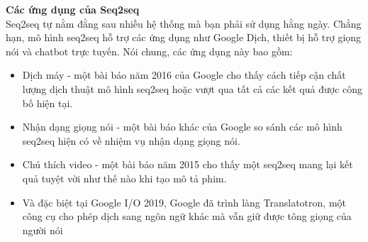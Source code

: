 
\large{\textbf{Các ứng dụng của Seq2seq}} \\[0.2em]
Seq2seq tự nằm đằng sau nhiều hệ thống mà bạn phải sử dụng hằng ngày. Chẳng hạn, mô hình seq2seq hỗ trợ các ứng dụng
như Google Dịch, thiết bị hỗ trợ giọng nói và chatbot trực tuyến. Nói chung, các ứng dụng này bao gồm:

\begin{itemize}
    \item Dịch máy - một bài báo năm 2016 của Google cho thấy cách tiếp cận chất lượng dịch thuật mô hình seq2seq
    hoặc vượt qua tất cả các kết quả được công bố hiện tại.
        {}
    \item Nhận dạng giọng nói - một bài báo khác của Google so sánh các mô hình seq2seq hiện có về nhiệm vụ nhận dạng
    giọng nói.
        {}
    \item Chú thích video - một bài báo năm 2015 cho thấy một seq2seq mang lại kết quả tuyệt vời như thế nào khi tạo
    mô tả phim.
        {}
    \item Và đặc biệt tại Google I/O 2019, Google đã trình làng Translatotron, một công cụ cho phép dịch sang ngôn
    ngữ khác mà vẫn giữ được tông giọng của người nói
\end{itemize}

